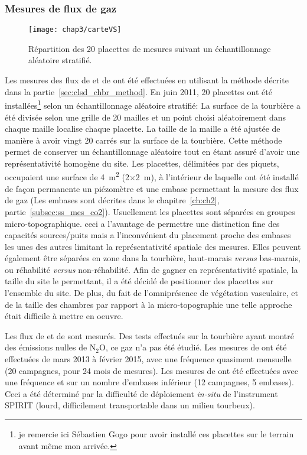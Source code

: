 \subsubsection{Mesures de flux de gaz}

\begin{figure}[t]
\centering
\texttt{[image: chap3/carteVS]}
\caption{Répartition des 20 placettes de mesures suivant un échantillonnage aléatoire stratifié.}
\label{fig:carteVS}
\end{figure}


Les mesures des flux de \coo et de \chh ont été effectuées en utilisant la méthode décrite dans la partie~\ref{sec:clsd_chbr_method}.
En juin 2011, 20 placettes ont été installées\footnote{je remercie ici Sébastien Gogo pour avoir installé ces placettes sur le terrain avant même mon arrivée.} selon un échantillonnage aléatoire stratifié:
La surface de la tourbière a été divisée selon une grille de 20 mailles et un point choisi aléatoirement dans chaque maille localise chaque placette.
La taille de la maille a été ajustée de manière à avoir vingt 20 carrés sur la surface de la tourbière.
Cette méthode permet de conserver un échantillonnage aléatoire tout en étant assuré d'avoir une représentativité homogène du site. 
Les placettes, délimitées par des piquets, occupaient une surface de \SI{4}{\square\metre} (2$\times$\SI{2}{\metre}), à l'intérieur de laquelle ont été installé de façon permanente un piézomètre et une embase permettant la mesure des flux de gaz (Les embases sont décrites dans le chapitre~\ref{ch:ch2}, partie~\ref{subsec:ss_mes_co2}).
Usuellement les placettes sont séparées en groupes micro-topographique. ceci a l'avantage de permettre une distinction fine des capacités sources/puits mais a l'inconvénient du placement proche des embases les unes des autres limitant la représentativité spatiale des mesures.
Elles peuvent également être séparées en zone dans la tourbière, haut-marais \textit{versus} bas-marais, ou réhabilité \textit{versus} non-réhabilité.
Afin de gagner en représentativité spatiale, la taille du site le permettant, il a été décidé de positionner des placettes sur l'ensemble du site.
De plus, du fait de l'omniprésence de végétation vasculaire, et de la taille des chambres par rapport à la micro-topographie une telle approche était difficile à mettre en oeuvre.

Les flux de \coo et de \chh sont mesurés.
Des tests effectués sur la tourbière ayant montré des émissions nulles de N$_{2}$O, ce gaz n'a pas été étudié.
Les mesures de \coo ont été effectuées de mars 2013 à février 2015, avec une fréquence quasiment mensuelle (20 campagnes, pour 24 mois de mesures). Les mesures de \chh ont été effectuées avec une fréquence et sur un nombre d'embases inférieur (12 campagnes, 5 embases).
Ceci a été déterminé par la difficulté de déploiement \textit{in-situ} de l'instrument SPIRIT (lourd, difficilement transportable dans un milieu tourbeux).

